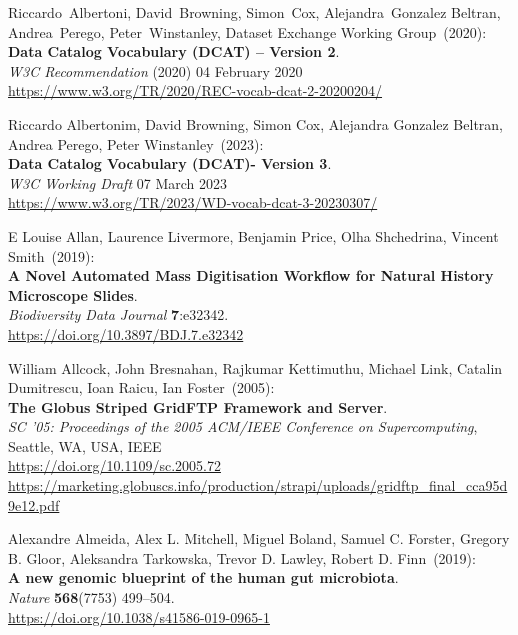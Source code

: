 \begin{thebibliography}{9}
Riccardo~Albertoni, David~Browning, Simon~Cox,
Alejandra~Gonzalez Beltran, Andrea~Perego, Peter~Winstanley, Dataset
Exchange Working Group~(2020): \\
\textbf{Data Catalog Vocabulary (DCAT) -- Version 2}.\\
\emph{W3C Recommendation} (2020)  04 February 2020 \\
\url{https://www.w3.org/TR/2020/REC-vocab-dcat-2-20200204/}

Riccardo Albertonim, David Browning, Simon Cox, Alejandra Gonzalez Beltran, Andrea Perego, Peter Winstanley~(2023): \\
\textbf{Data Catalog Vocabulary (DCAT)- Version 3}.\\
\emph{W3C Working Draft} 07 March 2023\\
\url{https://www.w3.org/TR/2023/WD-vocab-dcat-3-20230307/}

E Louise Allan, Laurence Livermore, Benjamin Price, Olha Shchedrina, Vincent Smith~(2019): \\
\textbf{A Novel Automated Mass Digitisation Workflow for Natural
History Microscope Slides}.\\
\emph{Biodiversity Data Journal} \textbf{7}:e32342.\\
\url{https://doi.org/10.3897/BDJ.7.e32342}

William Allcock, John Bresnahan, Rajkumar Kettimuthu, Michael Link, Catalin Dumitrescu, Ioan Raicu, Ian Foster~(2005): \\
\textbf{The Globus Striped GridFTP Framework and Server}.\\
\emph{{SC '05: Proceedings of the 2005 ACM/IEEE Conference on Supercomputing}},
{Seattle, WA, USA}, {IEEE} \\
\url{https://doi.org/10.1109/sc.2005.72}\\
\url{https://marketing.globuscs.info/production/strapi/uploads/gridftp_final_cca95d9e12.pdf}

Alexandre Almeida, Alex L. Mitchell, Miguel Boland, Samuel C.
Forster, Gregory B. Gloor, Aleksandra Tarkowska, Trevor D. Lawley,
Robert D. Finn~(2019): \\
\textbf{A new genomic blueprint of the human gut microbiota}.\\
\emph{Nature} \textbf{568}(7753) 499--504.\\
\url{https://doi.org/10.1038/s41586-019-0965-1}


\end{thebibliography}
